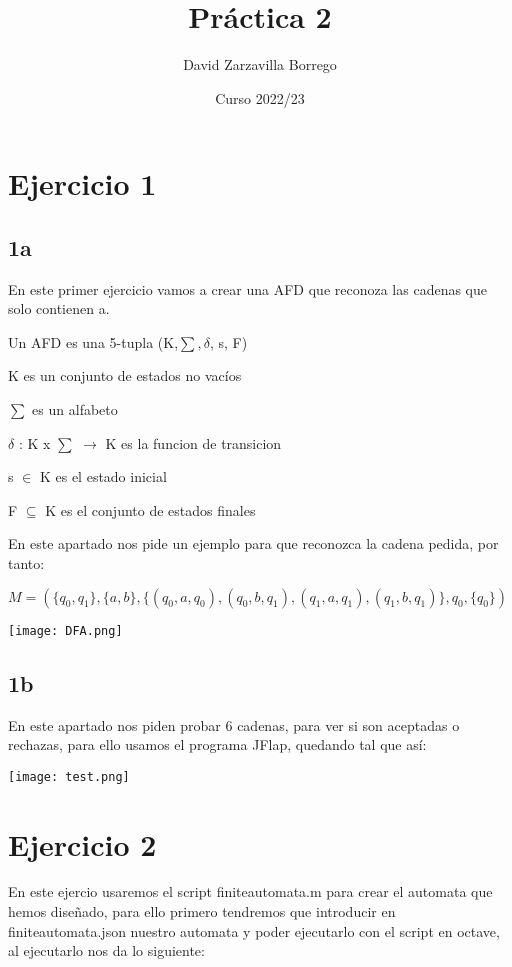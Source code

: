 \documentclass[12pt]{article}
\title{Práctica 2}
\author{David Zarzavilla Borrego}
\date{Curso 2022/23}
\begin{document}
\maketitle

\section{Ejercicio 1}
\subsection{1a}

En este primer ejercicio vamos a crear una AFD que reconoza las cadenas que solo contienen a.

Un AFD es una 5-tupla (K,$\sum, \delta$, s, F)

K es un conjunto de estados no vacíos

$\sum$ es un alfabeto

$\delta$ : K x $\sum$ $\rightarrow$ K es la funcion de transicion

s $\in$ K es el estado inicial

F $\subseteq$ K es el conjunto de estados finales

\vspace{5mm}
En este apartado nos pide un ejemplo para que reconozca la cadena pedida, por tanto:

$M = (\{q_0, q_1\}, \{a, b\}, \{(q_0, a, q_0), (q_0, b, q_1), (q_1, a, q_1), (q_1, b, q_1)\}, q_0, \{q_0\})$

\vspace{5mm}
\texttt{[image: DFA.png]}

\subsection{1b}

En este apartado nos piden probar 6 cadenas, para ver si son aceptadas o rechazas, para ello usamos el programa JFlap, quedando tal que así:

\vspace{5mm}
\texttt{[image: test.png]}

\newpage
\section{Ejercicio 2}

En este ejercio usaremos el script finiteautomata.m para crear el automata que hemos diseñado, para ello primero tendremos que introducir en finiteautomata.json nuestro automata y poder ejecutarlo con el script en octave, al ejecutarlo nos da lo siguiente:
\end{document}
